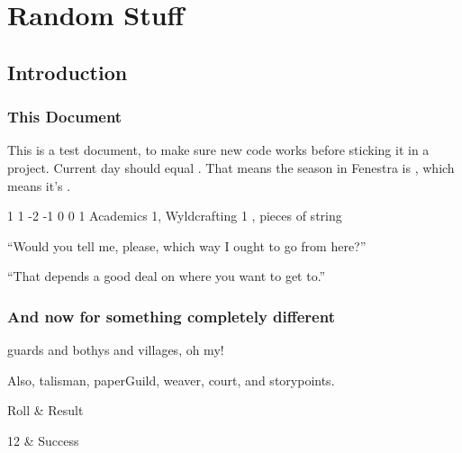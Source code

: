\documentclass[a4paper,openany]{book}
\date{\today}
\begin{document}
\frontmatter

\chapter{Random Stuff}

\section{Introduction}

\begin{multicols}{2}

\subsection{This Document}

This is a test document, to make sure new code works before sticking it in a project.
Current day should equal .
That means the season in Fenestra is \showSeason, which means it's \showTemperature.

{1}%
{1}%
{{-2}%
{-1}%
{0}}%
{0}%
{1}%
{Academics 1, Wyldcrafting 1
}%
{\Dagger, pieces of string}%
{
  \setcounter{Fate}{2}
}



\begin{speechtext}

  ``Would you tell me, please, which way I ought to go from here?''

  ``That depends a good deal on where you want to get to.''

\end{speechtext}

\subsection{And now for something completely different}

\Glspl{guard} and \glspl{bothy} and \glspl{village}, oh my!

Also, \gls{talisman}, \gls{paperGuild}, \gls{weaver}, \gls{court}, and \glspl{storypoint}.

\begin{boxtable}

Roll & Result \\\hline

12 & Success \\


\end{boxtable}
\end{multicols}
\end{document}
